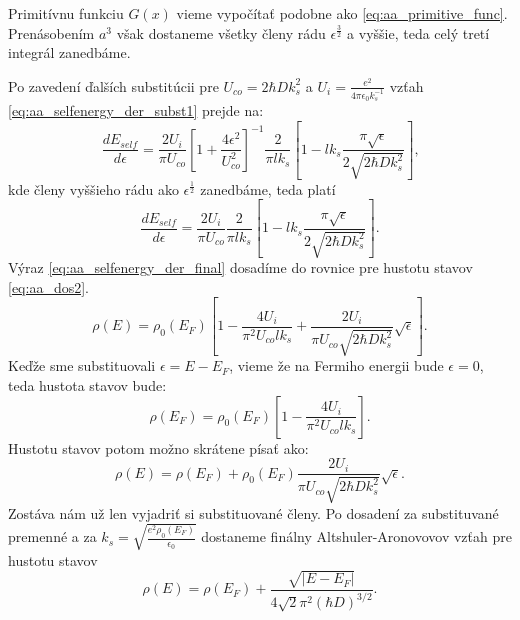 Primitívnu funkciu $G(x)$ vieme vypočítať podobne ako \eqref{eq:aa_primitive_func}. Prenásobením $a^3$ však dostaneme všetky členy rádu $\epsilon^{\frac{3}{2}}$ a vyššie, teda celý tretí integrál zanedbáme.

Po zavedení ďalších substitúcii pre $U_{co}=2\hbar D k_s^2$ a $U_i=\frac{e^2}{4\pi \epsilon_0 k_s^{-1}}$ vzťah
\eqref{eq:aa_selfenergy_der_subst1} prejde na:
\begin{equation}
\label{eq:aa_selfenergy_der_final}
\frac{dE_{self}}{d\epsilon}=\frac{2 U_i}{\pi U_{co}}[1+\frac{4 \epsilon^2}{U_{co}^2}]^{-1}\frac{2}{\pi l k_s}[1-l k_s \frac{\pi\sqrt\epsilon}{2\sqrt{2\hbar D k_s^2}}]\text{,}
\end{equation}
kde členy vyššieho rádu ako $\epsilon^{\frac{1}{2}}$ zanedbáme, teda platí
\begin{equation}
\label{eq:aa_selfenergy_der_final}
\frac{dE_{self}}{d\epsilon}=\frac{2 U_i}{\pi U_{co}}\frac{2}{\pi l k_s}[1-l k_s \frac{\pi\sqrt\epsilon}{2\sqrt{2\hbar D k_s^2}}]\text{.}
\end{equation}
Výraz  \eqref{eq:aa_selfenergy_der_final} dosadíme do rovnice pre hustotu stavov \eqref{eq:aa_dos2}.
\begin{equation}
 \label{eq:aa_dos3}
 \rho(E)=\rho_0(E_F)[1-\frac{4 U_i}{\pi^2 U_{co} lk_s}+\frac{2U_i }{\pi U_{co} \sqrt{2\hbar Dk_s^2}}\sqrt\epsilon ]\text{.}
\end{equation}
Keďže sme substituovali $\epsilon=E-E_F$, vieme že na Fermiho energii bude $\epsilon=0$, teda hustota stavov bude:
\begin{equation}
 \label{eq:aa_dos_fermi}
 \rho(E_F)=\rho_0(E_F)[1-\frac{4 U_i}{\pi^2 U_{co} lk_s}]\text{.}
\end{equation}
Hustotu stavov potom možno skrátene písať ako:
\begin{equation}
 \label{eq:aa_dos4}
 \rho(E)=\rho(E_F)+\rho_0(E_F)\frac{2U_i }{\pi U_{co} \sqrt{2\hbar Dk_s^2}}\sqrt\epsilon\text{.}
\end{equation}
Zostáva nám už len vyjadriť si substituované členy. Po dosadení za substituvané premenné a za
$k_s=\sqrt{\frac{e^2 \rho_0(E_F)}{\epsilon_0}}$ dostaneme finálny Altshuler-Aronovovov vzťah pre hustotu stavov
\begin{equation}
 \label{eq:aa_dos_final}
 \rho(E)=\rho(E_F)+\frac{\sqrt{|E-E_F|}}{4\sqrt 2 \pi^2 (\hbar D)^{3/2}}\text{.}
\end{equation}

